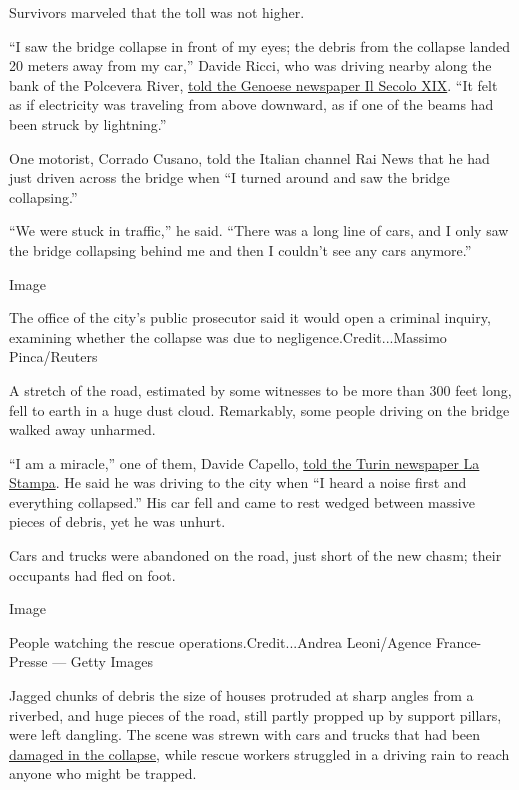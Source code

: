 Survivors marveled that the toll was not higher.

``I saw the bridge collapse in front of my eyes; the debris from the
collapse landed 20 meters away from my car,'' Davide Ricci, who was
driving nearby along the bank of the Polcevera River,
\href{http://www.ilsecoloxix.it/p/genova/2018/08/14/ADAu8O9-crollo_morandi_testimonianze.shtml}{told
the Genoese newspaper Il Secolo XIX}. ``It felt as if electricity was
traveling from above downward, as if one of the beams had been struck by
lightning.''

One motorist, Corrado Cusano, told the Italian channel Rai News that he
had just driven across the bridge when ``I turned around and saw the
bridge collapsing.''

``We were stuck in traffic,'' he said. ``There was a long line of cars,
and I only saw the bridge collapsing behind me and then I couldn't see
any cars anymore.''

Image

The office of the city's public prosecutor said it would open a criminal
inquiry, examining whether the collapse was due to
negligence.Credit...Massimo Pinca/Reuters

A stretch of the road, estimated by some witnesses to be more than 300
feet long, fell to earth in a huge dust cloud. Remarkably, some people
driving on the bridge walked away unharmed.

``I am a miracle,'' one of them, Davide Capello,
\href{http://www.lastampa.it/2018/08/14/italia/il-testimone-sono-andato-gi-con-il-ponte-non-so-che-cosa-mi-ha-salvato-aTLxiOyVRug7md4noz1t9I/pagina.html}{told
the Turin newspaper La Stampa}. He said he was driving to the city when
``I heard a noise first and everything collapsed.'' His car fell and
came to rest wedged between massive pieces of debris, yet he was unhurt.

Cars and trucks were abandoned on the road, just short of the new chasm;
their occupants had fled on foot.

Image

People watching the rescue operations.Credit...Andrea Leoni/Agence
France-Presse --- Getty Images

Jagged chunks of debris the size of houses protruded at sharp angles
from a riverbed, and huge pieces of the road, still partly propped up by
support pillars, were left dangling. The scene was strewn with cars and
trucks that had been \href{https://twitter.com/MFerraglioni}{damaged in
the collapse}, while rescue workers struggled in a driving rain to reach
anyone who might be trapped.

